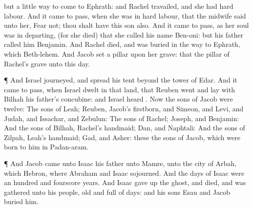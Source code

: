 {but a
little
way to
come to
Ephrath: and
Rachel
travailed, and she had
hard
labour.
And it came to pass, when she was in
hard
labour, that the
midwife
said unto her,
Fear not; thou shalt have this
son also.
And it came to pass, as her
soul was in
departing, (for she
died) that she
called his
name
Ben-oni: but his
father
called him
Benjamin.
And
Rachel
died, and was
buried in the
way to
Ephrath, which
{}
Beth-lehem.
And
Jacob
set a
pillar upon her
grave: that
{} the
pillar of
Rachel’s
grave unto this
day.
\par }{\PP {}¶ And
Israel
journeyed, and
spread his
tent
beyond the
tower of
Edar.
And it came to pass, when
Israel
dwelt in that
land, that
Reuben
went and
lay with
Bilhah his
father’s
concubine: and
Israel
heard
{}. Now the
sons of
Jacob were
twelve:
The
sons of
Leah;
Reuben,
Jacob’s
firstborn, and
Simeon, and
Levi, and
Judah, and
Issachar, and
Zebulun:
The
sons of
Rachel;
Joseph, and
Benjamin:
And the
sons of
Bilhah,
Rachel’s
handmaid;
Dan, and
Naphtali:
And the
sons of
Zilpah,
Leah’s
handmaid;
Gad, and
Asher: these
{} the
sons of
Jacob, which were
born to him in
Padan-aram.
\par }{\PP {}¶ And
Jacob
came unto
Isaac his
father unto
Mamre, unto the city of
Arbah, which
{}
Hebron, where
Abraham and
Isaac
sojourned.
And the
days of
Isaac were an
hundred and
fourscore
years.
And
Isaac gave up the
ghost, and
died, and was
gathered unto his
people,
{}
old and
full of
days: and his
sons
Esau and
Jacob
buried him.

}
